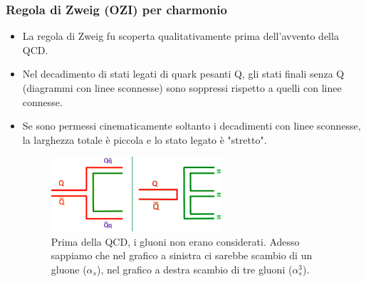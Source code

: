 \subsubsection{Regola di Zweig (OZI) per charmonio}
\begin{itemize}
    \item La regola di Zweig fu scoperta qualitativamente prima dell'avvento della QCD.
    \item Nel decadimento di stati legati di quark pesanti Q, gli stati finali senza Q (diagrammi con linee sconnesse) sono soppressi rispetto a quelli con linee connesse.
    \item Se sono permessi cinematicamente soltanto i decadimenti con linee sconnesse, la larghezza totale è piccola e lo stato legato è "stretto".
    \begin{figure}[H]
        \centering
        \includegraphics[width=0.6\textwidth]{immagini/fig_zweig_charmonium.png}
        \caption{Prima della QCD, i gluoni non erano considerati. Adesso sappiamo che nel grafico a sinistra ci sarebbe scambio di un gluone ($\alpha_s$), nel grafico a destra scambio di tre gluoni ($\alpha_s^3$).}
    \end{figure}
\end{itemize}

